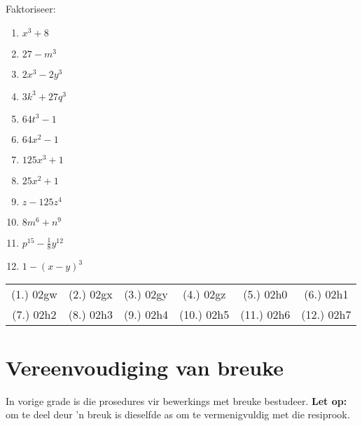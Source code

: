 \begin{exercises}{}
{

Faktoriseer:
\begin{multicols}{2}
\begin{enumerate}[itemsep=5pt, label=\textbf{\arabic*}. ] 
\item ${x}^{3}+8$
\item $27-m^{3}$
\item $2x^{3}-2y^{3}$
\item $3k^{3} + 27q^{3}$
\item $64t^{3}-1$
\item $64x^{2} -1$
\item $125x^{3} +1$
\item $25x^{2} +1$
\item $z-125z^4{}$
\item $8m^{6} + n^{9}$
\item $p^{15} - \frac{1}{8}y^{12}$
\item $1- (x-y)^3$
\end{enumerate}
\end{multicols}

\par \practiceinfo
\par \begin{tabular}[h]{cccccc}
(1.)	02gw	&
(2.)	02gx	&
(3.)	02gy	&
(4.)	02gz	&
(5.)	02h0	&
(6.)	02h1	\\ %
(7.)	02h2	&
(8.)	02h3	&
(9.)	02h4	&
(10.)	02h5	&
(11.)	02h6	&
(12.)	02h7	\\ %
\end{tabular}
}
\end{exercises}

\section{Vereenvoudiging van breuke}
\nopagebreak

In vorige grade is die prosedures vir bewerkings met breuke bestudeer.
\textbf{Let op:} om te deel deur 'n breuk is dieselfde as om te vermenigvuldig met die resiprook.\par

